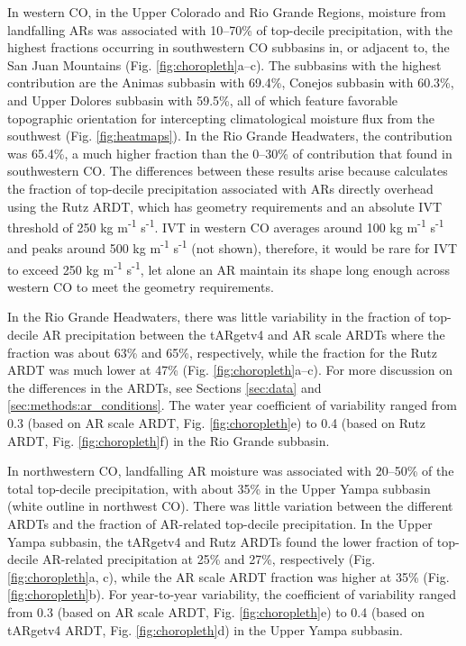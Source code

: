 \documentclass[draft]{agujournal2019}
\begin{document}
In western CO, in the Upper Colorado and Rio Grande Regions, moisture from landfalling ARs was associated with 10--70\% of top-decile precipitation, with the highest fractions occurring in southwestern CO subbasins in, or adjacent to, the San Juan Mountains (Fig. \ref{fig:choropleth}a--c). The subbasins with the highest contribution are the Animas subbasin with 69.4\%, Conejos subbasin with 60.3\%, and Upper Dolores subbasin with 59.5\%, all of which feature favorable topographic orientation for intercepting climatological moisture flux from the southwest (Fig. \ref{fig:heatmaps}). In the Rio Grande Headwaters, the contribution was 65.4\%, a much higher fraction than the 0--30\% of contribution that  found in southwestern CO. The differences between these results arise because  calculates the fraction of top-decile precipitation associated with ARs directly overhead using the Rutz ARDT, which has geometry requirements and an absolute IVT threshold of 250 kg m\textsuperscript{-1} s\textsuperscript{-1}. IVT in western CO averages around 100 kg m\textsuperscript{-1} s\textsuperscript{-1} and peaks around 500 kg m\textsuperscript{-1} s\textsuperscript{-1} (not shown), therefore, it would be rare for IVT to exceed 250 kg m\textsuperscript{-1} s\textsuperscript{-1}, let alone an AR maintain its shape long enough across western CO to meet the geometry requirements.

In the Rio Grande Headwaters, there was little variability in the fraction of top-decile AR precipitation between the tARgetv4 and AR scale ARDTs where the fraction was about 63\% and 65\%, respectively, while the fraction for the Rutz ARDT was much lower at 47\% (Fig. \ref{fig:choropleth}a--c). For more discussion on the differences in the ARDTs, see Sections \ref{sec:data} and \ref{sec:methods:ar_conditions}. The water year coefficient of variability ranged from 0.3 (based on AR scale ARDT, Fig. \ref{fig:choropleth}e) to 0.4 (based on Rutz ARDT, Fig. \ref{fig:choropleth}f) in the Rio Grande subbasin.

In northwestern CO, landfalling AR moisture was associated with 20--50\% of the total top-decile precipitation, with about 35\% in the Upper Yampa subbasin (white outline in northwest CO). There was little variation between the different ARDTs and the fraction of AR-related top-decile precipitation. In the Upper Yampa subbasin, the tARgetv4 and Rutz ARDTs found the lower fraction of top-decile AR-related precipitation at 25\% and 27\%, respectively (Fig. \ref{fig:choropleth}a, c), while the AR scale ARDT fraction was higher at 35\% (Fig. \ref{fig:choropleth}b). For year-to-year variability, the coefficient of variability ranged from 0.3 (based on AR scale ARDT, Fig. \ref{fig:choropleth}e) to 0.4 (based on tARgetv4 ARDT, Fig. \ref{fig:choropleth}d) in the Upper Yampa subbasin.
\end{document}
